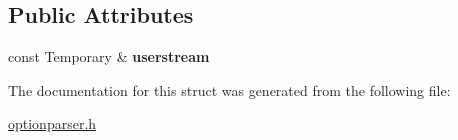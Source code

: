 \subsection*{Public Attributes}
\begin{DoxyCompactItemize}
\item 
\mbox{\label{structoption_1_1PrintUsageImplementation_1_1TemporaryWriter_a91d54cfcea7bb4072072506d46cc2cc8}} 
const Temporary \& {\bfseries userstream}
\end{DoxyCompactItemize}


The documentation for this struct was generated from the following file\+:\begin{DoxyCompactItemize}
\item 
\hyperlink{optionparser_8h}{optionparser.\+h}\end{DoxyCompactItemize}
